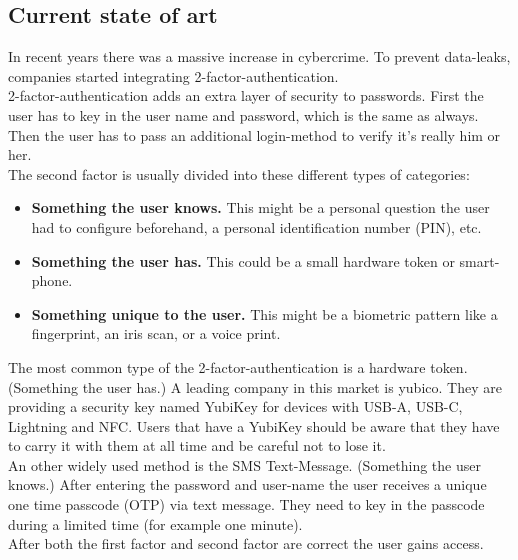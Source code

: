 \documentclass[conference]{IEEEtran}
\begin{document}
\subsection{Current state of art}
In recent years there was a massive increase in cybercrime. To prevent data-leaks, companies started integrating 2-factor-authentication.\cite{b4}\\
2-factor-authentication adds an extra layer of security to passwords. First the user has to key in the user name and password, which is the same as always. Then the user has to pass an additional login-method to verify it's really him or her.\\
The second factor is usually divided into these different types of categories:
\begin{itemize}
\item \textbf{Something the user knows.}  This might be a personal question the user had to configure beforehand, a personal identification number (PIN), etc.
\item \textbf{Something the user has.} This could be a small hardware token or smart-phone.
\item \textbf{Something unique to the user.} This might be a  biometric pattern like a fingerprint, an iris scan, or a voice print. 
\end{itemize}
The most common type of the 2-factor-authentication is a hardware token. (Something the user has.) A leading company in this market is yubico. They are providing a security key named YubiKey for devices with USB-A, USB-C, Lightning and NFC. Users that have a YubiKey should be aware that they have to carry it with them at all time and be careful not to lose it.\cite{b11}\\
An other widely used method is the SMS Text-Message. (Something the user knows.) After entering the password and user-name the user receives a unique one time passcode (OTP) via text message. They need to key in the passcode during a limited time (for example one minute).\\
After both the first factor and second factor are correct the user gains access.
                                                                                               
\end{document}
